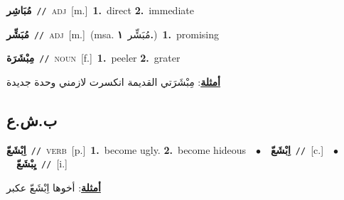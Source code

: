 \documentclass[10pt,a4paper,twoside]{article} %
\begin{document}
\begin{multicols}{2}
{\setlength\topsep{0pt}\textbf{\foreignlanguage{arabic}{مُبَاشِر}}\ {\color{gray}\texttt{//}\color{black}}\ \textsc{adj}\ [m.]\ \textbf{1.}~direct  \textbf{2.}~immediate\ } \vspace{2mm}

{\setlength\topsep{0pt}\textbf{\foreignlanguage{arabic}{مُبَشِّر}}\ {\color{gray}\texttt{//}\color{black}}\ \textsc{adj}\ [m.]\ \color{gray}(msa. \foreignlanguage{arabic}{مُبَشِّر}~\foreignlanguage{arabic}{\textbf{١.}})\color{black}\ \textbf{1.}~promising\ } \vspace{2mm}

{\setlength\topsep{0pt}\textbf{\foreignlanguage{arabic}{مِبْشَرَة}}\ {\color{gray}\texttt{//}\color{black}}\ \textsc{noun}\ [f.]\ \textbf{1.}~peeler  \textbf{2.}~grater\  \begin{flushright}\color{gray}\foreignlanguage{arabic}{\textbf{\underline{\foreignlanguage{arabic}{أمثلة}}}: مِبْشَرَتي القديمة انكسرت لازمني وحدة جديدة}\end{flushright}\color{black}} \vspace{2mm}

\vspace{-3mm}
\subsection*{\color{blue}\foreignlanguage{arabic}{ب.ش.ع}\color{blue}{}} 

{\setlength\topsep{0pt}\textbf{\foreignlanguage{arabic}{اِبْشَعّ}}\ {\color{gray}\texttt{//}\color{black}}\ \textsc{verb}\ [p.]\ \textbf{1.}~become ugly.  \textbf{2.}~become hideous\ \ $\bullet$\ \ \setlength\topsep{0pt}\textbf{\foreignlanguage{arabic}{اِبْشَعّ}}\ {\color{gray}\texttt{//}\color{black}}\ [c.]\ \ $\bullet$\ \ \setlength\topsep{0pt}\textbf{\foreignlanguage{arabic}{يِبْشَعّ}}\ {\color{gray}\texttt{//}\color{black}}\ [i.]\  \begin{flushright}\color{gray}\foreignlanguage{arabic}{\textbf{\underline{\foreignlanguage{arabic}{أمثلة}}}: أخوها اِبْشَعّ عكبر}\end{flushright}\color{black}} \vspace{2mm}


\end{multicols}
\end{document}
